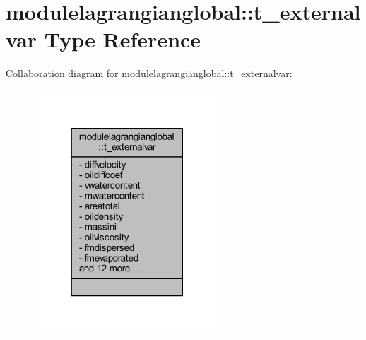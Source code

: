 \hypertarget{structmodulelagrangianglobal_1_1t__externalvar}{}\section{modulelagrangianglobal\+:\+:t\+\_\+externalvar Type Reference}
\label{structmodulelagrangianglobal_1_1t__externalvar}


Collaboration diagram for modulelagrangianglobal\+:\+:t\+\_\+externalvar\+:\nopagebreak
\begin{figure}[H]
\begin{center}
\leavevmode
\includegraphics[width=198pt]{structmodulelagrangianglobal_1_1t__externalvar__coll__graph}
\end{center}
\end{figure}
